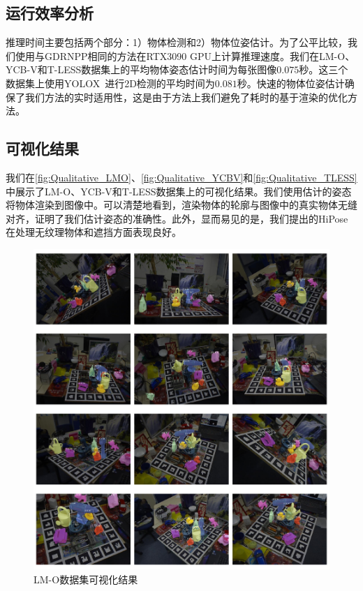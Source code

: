 \subsection{运行效率分析}

推理时间主要包括两个部分：1）物体检测和2）物体位姿估计。为了公平比较，我们使用与GDRNPP相同的方法在RTX3090 GPU上计算推理速度。我们在LM-O、YCB-V和T-LESS数据集上的平均物体姿态估计时间为每张图像$0.075$秒。这三个数据集上使用YOLOX~\cite{Ge2021YOLOXEY}进行2D检测的平均时间为$0.081$秒。快速的物体位姿估计确保了我们方法的实时适用性，这是由于方法上我们避免了耗时的基于渲染的优化方法。

\subsection{可视化结果}
我们在\autoref{fig:Qualitative_LMO}、\autoref{fig:Qualitative_YCBV}和\autoref{fig:Qualitative_TLESS}中展示了LM-O\cite{Brachmann2016UncertaintyDriven6P}、YCB-V\cite{xiang2018posecnn}和T-LESS\cite{hodan2017t}数据集上的可视化结果。我们使用估计的姿态将物体渲染到图像中。可以清楚地看到，渲染物体的轮廓与图像中的真实物体无缝对齐，证明了我们估计姿态的准确性。此外，显而易见的是，我们提出的HiPose在处理无纹理物体和遮挡方面表现良好。

\begin{figure}
    \centering
    \includegraphics[width=1\linewidth]{figure/hipose/lmo_visulize.pdf}
    \caption{LM-O数据集可视化结果}
    \label{fig:Qualitative_LMO}
\end{figure}

